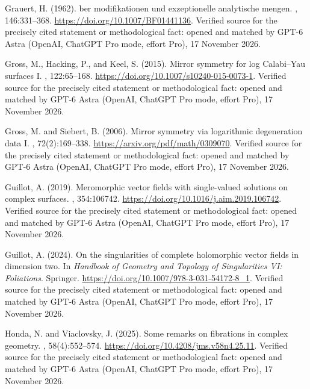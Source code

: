 \begin{thebibliography}{}
Grauert, H. (1962).
ber modifikationen und exzeptionelle analytische mengen.
, 146:331--368.
\newblock \url{https://doi.org/10.1007/BF01441136}. Verified source for the precisely cited statement or methodological fact: opened and matched by GPT-6 Astra (OpenAI, ChatGPT Pro mode, effort Pro), 17 November 2026.

Gross, M., Hacking, P., and Keel, S. (2015).
\newblock Mirror symmetry for log {Calabi--Yau} surfaces {I}.
, 122:65--168.
\newblock \url{https://doi.org/10.1007/s10240-015-0073-1}. Verified source for the precisely cited statement or methodological fact: opened and matched by GPT-6 Astra (OpenAI, ChatGPT Pro mode, effort Pro), 17 November 2026.

Gross, M. and Siebert, B. (2006).
\newblock Mirror symmetry via logarithmic degeneration data {I}.
, 72(2):169--338.
\newblock \url{https://arxiv.org/pdf/math/0309070}. Verified source for the precisely cited statement or methodological fact: opened and matched by GPT-6 Astra (OpenAI, ChatGPT Pro mode, effort Pro), 17 November 2026.

Guillot, A. (2019).
\newblock Meromorphic vector fields with single-valued solutions on complex
  surfaces.
, 354:106742.
\newblock \url{https://doi.org/10.1016/j.aim.2019.106742}. Verified source for the precisely cited statement or methodological fact: opened and matched by GPT-6 Astra (OpenAI, ChatGPT Pro mode, effort Pro), 17 November 2026.

Guillot, A. (2024).
\newblock On the singularities of complete holomorphic vector fields in
  dimension two.
\newblock In {\em Handbook of Geometry and Topology of Singularities VI:
  Foliations}. Springer.
\newblock \url{https://doi.org/10.1007/978-3-031-54172-8_1}. Verified source for the precisely cited statement or methodological fact: opened and matched by GPT-6 Astra (OpenAI, ChatGPT Pro mode, effort Pro), 17 November 2026.

Honda, N. and Viaclovsky, J. (2025).
\newblock Some remarks on fibrations in complex geometry.
, 58(4):552--574.
\newblock \url{https://doi.org/10.4208/jms.v58n4.25.11}. Verified source for the precisely cited statement or methodological fact: opened and matched by GPT-6 Astra (OpenAI, ChatGPT Pro mode, effort Pro), 17 November 2026.


\end{thebibliography}
